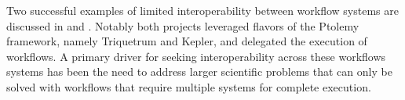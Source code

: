 Two successful examples of limited
interoperability between workflow systems are discussed in
\cite{brooks_triquetrum:_2015} and \cite{mandal_integrating_2007}. Notably
both projects leveraged flavors of the Ptolemy framework, namely Triquetrum
and Kepler, and delegated the execution of workflows. A primary driver for
seeking interoperability across these workflows systems has been the need to
address larger scientific problems that can only be solved with workflows that
require multiple systems for complete execution.






